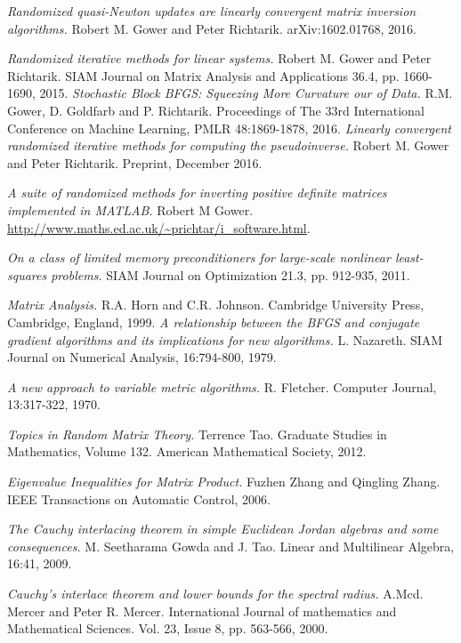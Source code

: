 \documentclass[12pt,conference,compsocconf]{IEEEtran}
\begin{document}
\begin{thebibliography}{1}

\textit{Randomized quasi-Newton updates are linearly convergent matrix inversion algorithms.}
Robert M. Gower and Peter Richtarik. arXiv:1602.01768, 2016.

\textit{Randomized iterative methods for linear systems.} Robert M. Gower and Peter Richtarik. SIAM Journal on Matrix Analysis and Applications 36.4, pp. 1660-1690, 2015.
\textit{Stochastic Block BFGS: Squeezing More Curvature our of Data.} R.M. Gower, D. Goldfarb and P. Richtarik. Proceedings of The 33rd International Conference on Machine Learning, PMLR 48:1869-1878, 2016.
\textit{Linearly convergent randomized iterative methods for computing the pseudoinverse.} Robert M. Gower and Peter Richtarik. Preprint, December 2016.

\textit{A suite of randomized methods for inverting positive definite matrices implemented in MATLAB.} Robert M Gower. \url{http://www.maths.ed.ac.uk/~prichtar/i_software.html}.

\textit{On a class of limited memory preconditioners for large-scale nonlinear least-squares problems.} SIAM Journal on Optimization 21.3, pp. 912-935, 2011.

\textit{Matrix Analysis.} R.A. Horn and C.R. Johnson. Cambridge University Press, Cambridge, England, 1999.
\textit{A relationship between the BFGS and conjugate gradient algorithms and its implications for new algorithms.} L. Nazareth. SIAM Journal on Numerical Analysis, 16:794-800, 1979.

\textit{A new approach to variable metric algorithms.} R. Fletcher. Computer Journal, 13:317-322, 1970.

\textit{Topics in Random Matrix Theory.} Terrence Tao. Graduate Studies in Mathematics, Volume 132. American Mathematical Society, 2012.

\textit{Eigenvalue Inequalities for Matrix Product.} Fuzhen Zhang and Qingling Zhang. IEEE Transactions on Automatic Control, 2006.

\textit{The Cauchy interlacing theorem in simple Euclidean Jordan algebras and some consequences.}
M. Seetharama Gowda and J. Tao. Linear and Multilinear Algebra, 16:41, 2009.

\textit{Cauchy's interlace theorem and lower bounds for the spectral radius.} A.Mcd. Mercer and Peter R. Mercer. International Journal of mathematics and Mathematical Sciences. Vol. 23, Issue 8, pp. 563-566, 2000.


\end{thebibliography}
\end{document}
